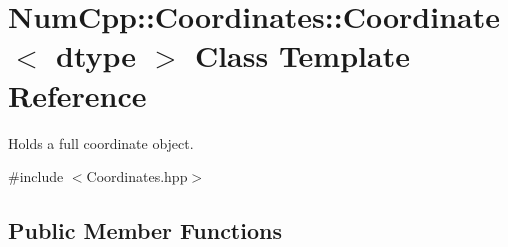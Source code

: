 \hypertarget{class_num_cpp_1_1_coordinates_1_1_coordinate}{}\section{Num\+Cpp\+:\+:Coordinates\+:\+:Coordinate$<$ dtype $>$ Class Template Reference}
\label{class_num_cpp_1_1_coordinates_1_1_coordinate}


Holds a full coordinate object.  




{\ttfamily \#include $<$Coordinates.\+hpp$>$}

\subsection*{Public Member Functions}
